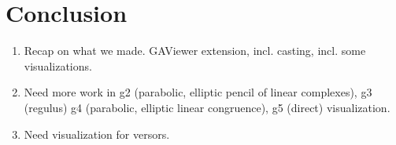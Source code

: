 \section{Conclusion}
\label{ch:conclusion}


\begin{enumerate}
  \item Recap on what we made. GAViewer extension, incl. casting, incl. some visualizations.
  \item Need more work in g2 (parabolic, elliptic pencil of linear complexes), g3 (regulus) g4 (parabolic, elliptic linear congruence), g5 (direct) visualization.
  \item Need visualization for versors.
\end{enumerate}
